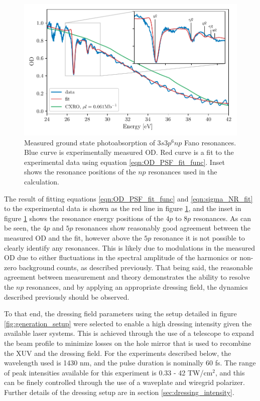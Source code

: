 \begin{figure}
	\centering
	\includegraphics[width=1.0\textwidth]{figures/ATS/fano_fit.pdf}
	\caption{Measured ground state photoabsorption of $3s3p^6np$ Fano resonances.  Blue curve is experimentally measured OD.  Red curve is a fit to the experimental data using equation \ref{eqn:OD_PSF_fit_func}. Inset shows the resonance positions of the $np$ resonances used in the calculation.}
	\label{fig:fano_fit}
\end{figure}

The result of fitting equations \ref{eqn:OD_PSF_fit_func} and \ref{eqn:sigma_NR_fit} to the experimental data is shown as the red line in figure \ref{fig:fano_fit}, and the inset in figure \ref{fig:fano_fit} shows the resonance energy positions of the $4p$ to $8p$ resonances. As can be seen, the $4p$ and $5p$ resonances show reasonably good agreement between the measured OD and the fit, however above the $5p$ resonance it is not possible to clearly identify any resonances. This is likely due to modulations in the measured OD due to either fluctuations in the spectral amplitude of the harmonics or non-zero background counts, as described previously.  That being said, the reasonable agreement between measurement and theory demonstrates the ability to resolve the $np$ resonances, and by applying an appropriate dressing field, the dynamics described previously should be observed.

To that end, the dressing field parameters using the setup detailed in figure \ref{fig:generation_setup} were selected to enable a high dressing intensity given the available laser systems.  This is achieved through the use of a telescope to expand the beam profile to minimize losses on the hole mirror that is used to recombine the XUV and the dressing field. For the experiments described below, the wavelength used is 1430 nm, and the pulse duration is nominally 60 fs.  The range of peak intensities available for this experiment is 0.33 - 42 TW/cm$^{2}$, and this can be finely controlled through the use of a waveplate and wiregrid polarizer.  Further details of the dressing setup are in section \ref{sec:dressing_intensity}.


